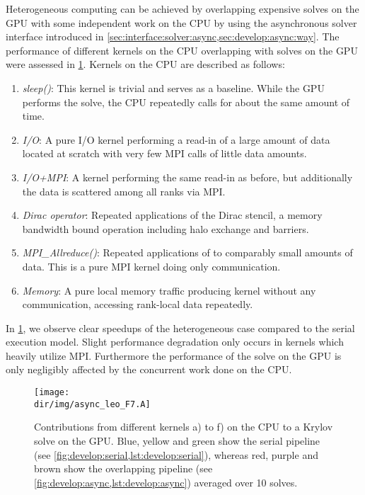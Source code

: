 Heterogeneous computing can be achieved by overlapping expensive solves on the GPU with some independent work on the CPU by using the asynchronous solver interface introduced in \cref{sec:interface:solver:async,sec:develop:async:way}.
The performance of different kernels on the CPU overlapping with solves on the GPU were assessed in \cref{fig:async:F7:leo:bar}.
Kernels on the CPU are described as follows:
\begin{enumerate}[label=\alph*)]
    \item \emph{sleep()}: This kernel is trivial and serves as a baseline. While the GPU performs the solve, the CPU repeatedly calls  for about the same amount of time.
    \item \emph{I/O}: A pure I/O kernel performing a read-in of a large amount of data located at scratch with very few MPI calls of little data amounts.
    \item \emph{I/O+MPI}: A kernel performing the same read-in as before, but additionally the data is scattered among all ranks via MPI.
    \item \emph{Dirac operator}: Repeated applications of the Dirac stencil, a memory bandwidth bound operation including halo exchange and barriers.
    \item \emph{MPI\_Allreduce()}: Repeated applications of  to comparably small amounts of data. This is a pure MPI kernel doing only communication.
    \item \emph{Memory}: A pure local memory traffic producing kernel without any communication, accessing rank-local data repeatedly.
\end{enumerate}

In \cref{fig:async:F7:leo:bar}, we observe clear speedups of the heterogeneous case compared to the serial execution model.
Slight performance degradation only occurs in kernels which heavily utilize MPI.
Furthermore the performance of the solve on the GPU is only negligibly affected by the concurrent work done on the CPU.
\begin{figure}
    \centering
    \texttt{[image: \\dir/img/async\_leo\_F7.A]}
    \caption{Contributions from different kernels a) to f) on the CPU to a Krylov solve on the GPU. Blue, yellow and green show the serial pipeline (see \cref{fig:develop:serial,lst:develop:serial}), whereas red, purple and brown show the overlapping pipeline (see \cref{fig:develop:async,lst:develop:async}) averaged over \num{10} solves. }
    \label{fig:async:F7:leo:bar}
\end{figure}

